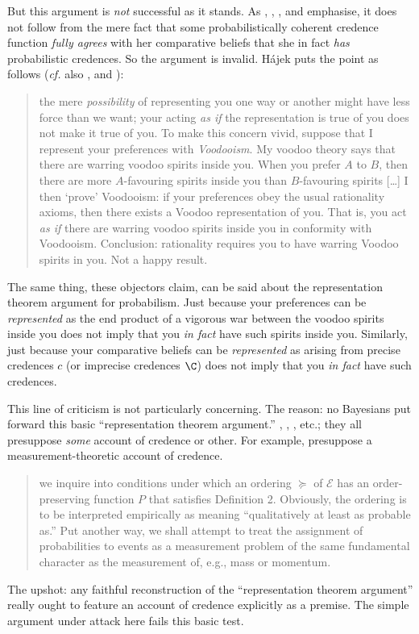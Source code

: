 But this argument is \textit{not} successful as it stands. As \citet{Eriksson2007}, \citet{Hajek2009b}, \citet{Meacham2011}, and \citet{Titelbaum2015} emphasise, it does not follow from the mere fact that some probabilistically coherent credence function \textit{fully agrees} with her comparative beliefs that she in fact \textit{has} probabilistic credences. So the argument is invalid. H\'{a}jek puts the point as follows (\textit{cf.} also \citealp[p. 14]{Meacham2011}, and \citealp[p. 274]{Titelbaum2015}):
\begin{quote}
the mere \emph{possibility} of representing you one way or another might have less force than we want; your acting \emph{as if} the representation is true of you does not make it true of you. To make this concern vivid, suppose that I represent your preferences with \emph{Voodooism}. My voodoo theory says that there are warring voodoo spirits inside you. When you prefer $A$ to $B$, then there are more $A$-favouring spirits inside you than $B$-favouring spirits [\ldots] I then `prove' Voodooism: if your preferences obey the usual rationality axioms, then there exists a Voodoo representation of you. That is, you act \emph{as if} there are warring voodoo spirits inside you in conformity with Voodooism. Conclusion: rationality requires you to have warring Voodoo spirits in you. Not a happy result. \citep[p. 238]{Hajek2009b}
\end{quote}
The same thing, these objectors claim, can be said about the representation theorem argument for probabilism. Just because your preferences can be \emph{represented} as the end product of a vigorous war between the voodoo spirits inside you does not imply that you \emph{in fact} have such spirits inside you. Similarly, just because your comparative beliefs can be \emph{represented} as arising from precise credences $c$ (or imprecise credences $\C$) does not imply that you \emph{in fact} have such credences.

This line of criticism is not particularly concerning. The reason: no Bayesians put forward this basic ``representation theorem argument.'' \citeauthor{Koopman1940b}, \citeauthor{Savage1954}, \citeauthor{Joyce2010}, etc.; they all presuppose \textit{some} account of credence or other. For example, \citeauthor{Krantz1971} presuppose a measurement-theoretic account of credence. 
\begin{quote}
we inquire into conditions under which an ordering $\succeq$ of $\mathscr{E}$ has an order-preserving function $P$ that satisfies Definition 2. Obviously, the ordering is to be interpreted empirically as meaning ``qualitatively at least as probable as.'' Put another way, we shall attempt to treat the assignment of probabilities to events as a measurement problem of the same fundamental character as the measurement of, e.g., mass or momentum. \citep[pp. 199--202]{Krantz1971} 
\end{quote}
The upshot: any faithful reconstruction of the ``representation theorem argument'' really ought to feature an account of credence explicitly as a premise. The simple argument under attack here fails this basic test.


